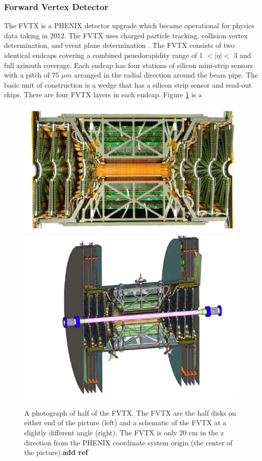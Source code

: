 \subsubsection{Forward Vertex Detector}
The FVTX is a PHENIX detector upgrade which became operational for physics data taking in 2012. The FVTX uses charged particle tracking, collision vertex determination, and event plane determination \cite{Aidala201444}. The FVTX consists of two identical endcaps covering a combined psuedorapidity range of 1 $<|\eta|<$ 3 and full azimuth coverage. Each endcap has four stations of silicon mini-strip sensors with a pitch of 75 $\mu m$ arranged in the radial direction around the beam pipe. The basic unit of construction is a wedge that has a silicon strip sensor and read-out chips. There are four FVTX layers in each endcap. Figure \ref{fig:fvtx_cutaway} is a 
\begin{figure}[h!]
\begin{center}
\includegraphics[width=0.45\linewidth]{figs/fvtx_cutaway.png}
\includegraphics[width=0.45\linewidth]{figs/fvtx_diagram.png}
\caption{A photograph of half of the FVTX. The FVTX are the half disks on either end of the picture (left) and a schematic of the FVTX at a slightly different angle (right). The FVTX is only 20 cm in the z direction from the PHENIX coordinate system origin (the center of the picture).\textbf{add ref}}
\label{fig:fvtx_cutaway}
\end{center}
\end{figure}
